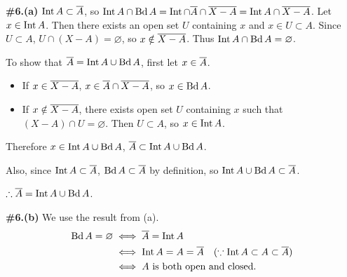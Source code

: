 \documentclass[a4paper,11pt]{article}
\begin{document}
\begin{minipage}[t][270mm]{90mm}
    {\bfseries \large \#6.(a)} \(\operatorname{Int} A \subset \overline{A}\), so \(\operatorname{Int} A \cap \operatorname{Bd} A = \operatorname{Int} \cap \overline{A} \cap \overline{X - A} = \operatorname{Int} A \cap \overline{X - A}\). Let \(x \in \operatorname{Int} A\). Then there exists an open set \(U\) containing \(x\) and \(x \in U \subset A\). Since \(U \subset A\), \(U \cap (X - A) = \varnothing\), so \(x \notin \overline{X - A}\). Thus \(\operatorname{Int} A \cap \operatorname{Bd} A = \varnothing\).

    \bigskip

    To show that \(\overline{A} = \operatorname{Int} A \cup \operatorname{Bd} A\), first let \(x \in \overline{A}\).
    \begin{itemize}
        \item If \(x \in \overline{X - A}\), \(x \in \overline{A} \cap \overline{X - A}\), so \(x \in \operatorname{Bd} A\).
        \item If \(x \notin \overline{X - A}\), there exists open set \(U\) containing \(x\) such that \((X - A) \cap U = \varnothing\). Then \(U \subset A\), so \(x \in \operatorname{Int} A\).
    \end{itemize}
    Therefore \(x \in \operatorname{Int} A \cup \operatorname{Bd} A\), \(\overline{A} \subset \operatorname{Int} A \cup \operatorname{Bd} A\).

    Also, since \(\operatorname{Int} A \subset \overline{A}\), \(\operatorname{Bd} A \subset \overline{A}\) by definition, so \(\operatorname{Int} A \cup \operatorname{Bd} A \subset \overline{A}\).

    \bigskip

    \(\therefore \overline{A} = \operatorname{Int} A \cup \operatorname{Bd} A\).
\end{minipage}
{\color{gray}\vline}
\begin{minipage}[t][270mm]{90mm}
    \phantom{?} {\bfseries \large \#6.(b)} We use the result from (a).
    \[
        \begin{aligned}
            \operatorname{Bd} A = \varnothing & \iff \overline{A} = \operatorname{Int} A                                                       \\
                                & \iff \operatorname{Int} A = A = \overline{A} \quad (\because \operatorname{Int} A \subset A \subset \overline{A}) \\
                                & \iff A \text{ is both open and closed}.
        \end{aligned}
    \]
\end{minipage}

\newpage

\phantom{?}
\vspace{5mm}
\end{document}
